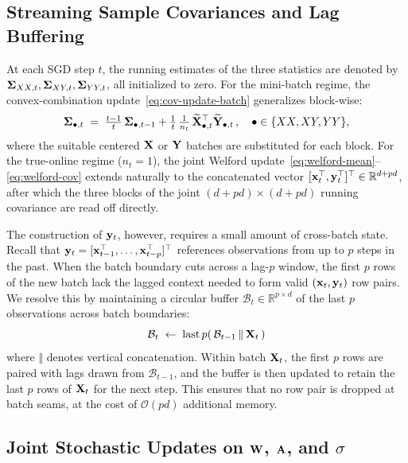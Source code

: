\documentclass[journal,twoside]{IEEEtran}
\begin{document}
\subsection{Streaming Sample Covariances and Lag Buffering}
\label{sec:cov-svar}

At each SGD step $t$, the running estimates of the three statistics are
denoted by $\boldsymbol{\Sigma}_{XX, t}, \boldsymbol{\Sigma}_{XY, t},
\boldsymbol{\Sigma}_{YY, t}$, all initialized to zero. For the mini-batch
regime, the convex-combination update~\eqref{eq:cov-update-batch}
generalizes block-wise:
\begin{equation}
\label{eq:svar-cov-update}
\boldsymbol{\Sigma}_{\bullet, t}
\;=\;
\tfrac{t-1}{t}\,\boldsymbol{\Sigma}_{\bullet, t-1}
+ \tfrac{1}{t}\,
\tfrac{1}{n_t}\,\widetilde{{\mathbf X}}_{\bullet, t}^\top
\widetilde{{\mathbf Y}}_{\bullet, t}\,,
\quad \bullet \in \{XX, XY, YY\},
\end{equation}
where the suitable centered ${\mathbf X}$ or ${\mathbf Y}$ batches are
substituted for each block. For the true-online regime ($n_t = 1$), the
joint Welford update~\eqref{eq:welford-mean}--\eqref{eq:welford-cov}
extends naturally to the concatenated vector
$[{\mathbf x}_t^\top, {\mathbf y}_t^\top]^\top \in \mathbb{R}^{d + pd}$, after
which the three blocks of the joint $(d+pd) \times (d+pd)$ running
covariance are read off directly.

The construction of ${\mathbf y}_t$, however, requires a small amount of
cross-batch state. Recall that
${\mathbf y}_t = [{\mathbf x}_{t-1}^\top, \ldots, {\mathbf x}_{t-p}^\top]^\top$
references observations from up to $p$ steps in the past. When the
batch boundary cuts across a lag-$p$ window, the first $p$ rows of the
new batch lack the lagged context needed to form valid
$({\mathbf x}_t, {\mathbf y}_t)$ row pairs. We resolve this by maintaining a
circular buffer $\mathcal{B}_t \in \mathbb{R}^{p \times d}$ of the last
$p$ observations across batch boundaries:
\begin{equation}
\label{eq:buffer-update}
\mathcal{B}_t \;\leftarrow\; \mathrm{last\,}p(\,
\mathcal{B}_{t-1} \,\Vert\, {\mathbf X}_t\,)
\end{equation}
where $\Vert$ denotes vertical concatenation. Within batch ${\mathbf X}_t$,
the first $p$ rows are paired with lags drawn from $\mathcal{B}_{t-1}$,
and the buffer is then updated to retain the last $p$ rows of
${\mathbf X}_t$ for the next step. This ensures that no row pair is dropped
at batch seams, at the cost of $\mathcal{O}(pd)$ additional memory.

\subsection{Joint Stochastic Updates on ${\mathbf W}$, ${\mathbf A}$, and $\sigma$}
\label{sec:sgd-svar}
\end{document}
